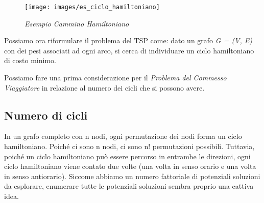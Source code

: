\begin{figure}[ht]
	\centering
	\texttt{[image: images/es\_ciclo\_hamiltoniano]}
	\caption{\textit{Esempio Cammino Hamiltoniano}}
	\label{img:es_ciclo_hamiltoniano}
\end{figure}

Possiamo ora riformulare il problema del TSP come: dato un grafo \textit{G = (V, E)} con dei pesi associati ad ogni arco, si cerca di individuare un ciclo hamiltoniano di costo minimo.

Possiamo fare una prima considerazione per il \textit{Problema del Commesso Viaggiatore} in relazione al numero dei cicli che si possono avere.

\subsection{Numero di cicli}
In un grafo completo con n nodi, ogni permutazione dei nodi forma un ciclo hamiltoniano. Poiché ci sono n nodi, ci sono n! permutazioni possibili. Tuttavia, poiché un ciclo hamiltoniano può essere percorso in entrambe le direzioni, ogni ciclo hamiltoniano viene contato due volte (una volta in senso orario e una volta in senso antiorario). Siccome abbiamo un numero fattoriale di potenziali soluzioni da esplorare, enumerare tutte le potenziali soluzioni sembra proprio una cattiva idea.
